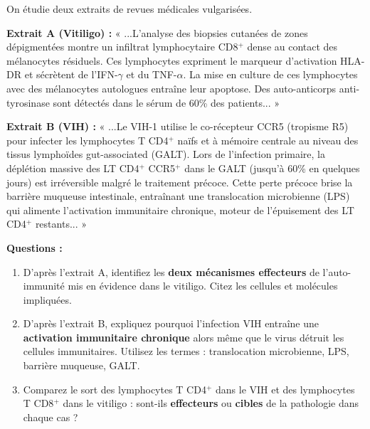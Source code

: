 \documentclass[11pt]{article}
\begin{document}
\begin{exercice}
On étudie deux extraits de revues médicales vulgarisées.

\textbf{Extrait A (Vitiligo) :} « ...L'analyse des biopsies cutanées de zones dépigmentées montre un infiltrat lymphocytaire CD8$^+$ dense au contact des mélanocytes résiduels. Ces lymphocytes expriment le marqueur d'activation HLA-DR et sécrètent de l'IFN-$\gamma$ et du TNF-$\alpha$. La mise en culture de ces lymphocytes avec des mélanocytes autologues entraîne leur apoptose. Des auto-anticorps anti-tyrosinase sont détectés dans le sérum de 60\% des patients... »

\textbf{Extrait B (VIH) :} « ...Le VIH-1 utilise le co-récepteur CCR5 (tropisme R5) pour infecter les lymphocytes T CD4$^+$ naïfs et à mémoire centrale au niveau des tissus lymphoïdes gut-associated (GALT). Lors de l'infection primaire, la déplétion massive des LT CD4$^+$ CCR5$^+$ dans le GALT (jusqu'à 60\% en quelques jours) est irréversible malgré le traitement précoce. Cette perte précoce brise la barrière muqueuse intestinale, entraînant une translocation microbienne (LPS) qui alimente l'activation immunitaire chronique, moteur de l'épuisement des LT CD4$^+$ restants... »

\textbf{Questions :}
\begin{enumerate}
    \item D'après l'extrait A, identifiez les \textbf{deux mécanismes effecteurs} de l'auto-immunité mis en évidence dans le vitiligo. Citez les cellules et molécules impliquées.
    \item D'après l'extrait B, expliquez pourquoi l'infection VIH entraîne une \textbf{activation immunitaire chronique} alors même que le virus détruit les cellules immunitaires. Utilisez les termes : translocation microbienne, LPS, barrière muqueuse, GALT.
    \item Comparez le sort des lymphocytes T CD4$^+$ dans le VIH et des lymphocytes T CD8$^+$ dans le vitiligo : sont-ils \textbf{effecteurs} ou \textbf{cibles} de la pathologie dans chaque cas ?
\end{enumerate}
\end{exercice}
\end{document}
